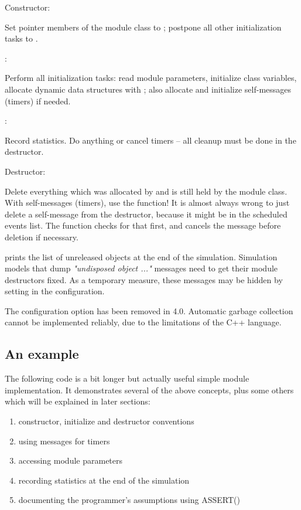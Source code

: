 \begin{description}

\item Constructor:

Set pointer members of the module class to ; postpone all other
initialization tasks to .

\item {}:

Perform all initialization tasks: read module parameters, initialize
class variables, allocate dynamic data structures with ;
also allocate and initialize self-messages (timers) if needed.

\item {}:

Record statistics. Do   anything or cancel timers --
all cleanup must be done in the destructor.

\item Destructor:

Delete everything which was allocated by  and is still held
by the module class. With self-messages (timers), use the
 function! It is almost always wrong
to just delete a self-message from the destructor, because it might be
in the scheduled events list. The  function
checks for that first, and cancels the message before deletion if necessary.

\end{description}

{\opp} prints the list of unreleased objects at the end of the simulation.
Simulation models that dump \textit{"undisposed object ..."} messages need
to get their module destructors fixed. As a temporary measure, these
messages may be hidden by setting  in the
configuration.

\begin{note}
    The  configuration option has been removed in {\opp} 4.0.
    Automatic garbage collection cannot be implemented reliably, due to the
    limitations of the C++ language.
\end{note}

\subsection{An example}

The following code is a bit longer but actually useful simple module
implementation. It demonstrates several of the above concepts, plus
some others which will be explained in later sections:
\begin{enumerate}
  \item{constructor, initialize and destructor conventions}
  \item{using messages for timers}
  \item{accessing module parameters}
  \item{recording statistics at the end of the simulation}
  \item{documenting the programmer's assumptions using ASSERT()}
\end{enumerate}

